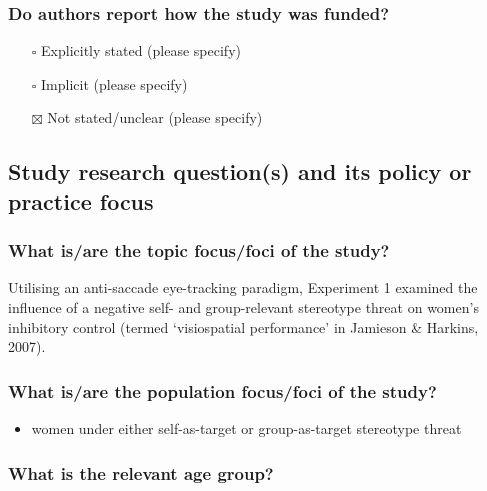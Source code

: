 \documentclass[
  doc, a4paper]{apa7}
\providecommand{\tightlist}{%
  \setlength{\itemsep}{0pt}\setlength{\parskip}{0pt}}
\begin{document}
\subsubsection{Do authors report how the study was funded?}\label{do-authors-report-how-the-study-was-funded}

\begin{itemize}
\tightlist
\item[$\square$]
  Explicitly stated (please specify)\\
\item[$\square$]
  Implicit (please specify)\\
\item[$\boxtimes$]
  Not stated/unclear (please specify)
\end{itemize}

\subsection{Study research question(s) and its policy or practice focus}\label{study-research-questions-and-its-policy-or-practice-focus}

\subsubsection{What is/are the topic focus/foci of the study?}\label{what-isare-the-topic-focusfoci-of-the-study}

Utilising an anti-saccade eye-tracking paradigm, Experiment 1 examined the influence of a negative self- and group-relevant stereotype threat on women's inhibitory control (termed `visiospatial performance' in Jamieson \& Harkins, 2007).

\subsubsection{What is/are the population focus/foci of the study?}\label{what-isare-the-population-focusfoci-of-the-study}

\begin{itemize}
\tightlist
\item
  women under either self-as-target or group-as-target stereotype threat
\end{itemize}

\subsubsection{What is the relevant age group?}\label{what-is-the-relevant-age-group}
\end{document}
